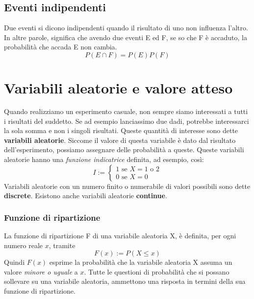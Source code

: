 \documentclass[11pt]{article}
\begin{document}
\subsection{Eventi indipendenti}
Due eventi si dicono indipendenti quando il risultato di uno non influenza l'altro. In altre parole, significa che avendo due eventi E ed F, se so che F è accaduto, la probabilità che accada E non cambia.
\begin{displaymath}
    P(E\cap F) = P(E) P(F)
\end{displaymath}
\section{Variabili aleatorie e valore atteso}
Quando realizziamo un esperimento casuale, non sempre siamo interessati a tutti i risultati del suddetto. Se ad esempio lanciassimo due dadi, potrebbe interessarci la sola somma e non i singoli risultati. 
Queste quantità di interesse sono dette \textbf{variabili aleatorie}. Siccome il valore di questa variabile è dato dal risultato dell'esperimento, possiamo assegnare delle probabilità a queste. Queste variabili aleatorie hanno una \textit{funzione indicatrice} definita, ad esempio, così:
\begin{displaymath}
    I:=
    \begin{cases}
        1 \mbox{ se } X = 1 \mbox{ o } 2\\
        0 \mbox{ se } X = 0
    \end{cases}
\end{displaymath}
Variabili aleatorie con un numero finito o numerabile di valori possibili sono dette \textbf{discrete}. Esistono anche variabili aleatorie \textbf{continue}.
\subsubsection{Funzione di ripartizione}
La funzione di ripartizione F di una variabile aleatoria X, è definita, per ogni numero reale $x$, tramite
\begin{displaymath}
    F(x) := P(X\le x)
\end{displaymath}
Quindi $F(x)$ esprime la probabilità che la variabile aleatoria X assuma un valore \textit{minore o uguale} a $x$. Tutte le questioni di probabilità che si possano sollevare su una variabile aleatoria, ammettono una risposta in termini della sua funzione di ripartizione.
\end{document}
